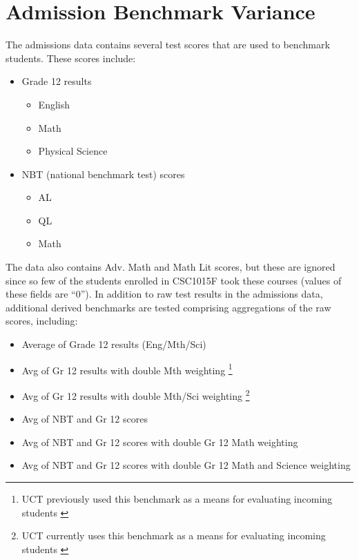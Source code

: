 \section{Admission Benchmark Variance}
The admissions data contains several test scores that are used to benchmark students. These scores include:

\begin{itemize}
    \item Grade 12 results
          \begin{itemize}
              \item English
              \item Math
              \item Physical Science
          \end{itemize}
    \item NBT (national benchmark test) scores
          \begin{itemize}
              \item AL
              \item QL
              \item Math
          \end{itemize}
\end{itemize}

The data also contains Adv. Math and Math Lit scores, but these are ignored since so few of the students enrolled in CSC1015F took these courses (values of these fields are ``0''). In addition to raw test results in the admissions data, additional derived benchmarks are tested comprising aggregations of the raw scores, including:

\begin{itemize}
    \item Average of Grade 12 results (Eng/Mth/Sci)
    \item Avg of Gr 12 results with double Mth weighting \footnote{UCT previously used this benchmark as a means for evaluating incoming students \cite{sonia2018}}
    \item Avg of Gr 12 results with double Mth/Sci weighting \footnote{UCT currently uses this benchmark as a means for evaluating incoming students \cite{sonia2018}}
    \item Avg of NBT and Gr 12 scores
    \item Avg of NBT and Gr 12 scores with double Gr 12 Math weighting
    \item Avg of NBT and Gr 12 scores with double Gr 12 Math and Science weighting
\end{itemize}

